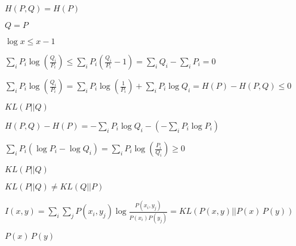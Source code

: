 \documentclass{article}
\def\lthtmlcheckvsize{\ifdim\ht\sizebox<\vsize 
  \ifdim\wd\sizebox<\hsize\expandafter\hfill\fi \expandafter\vfill
  \else\expandafter\vss\fi}%
\begin{document}
{\newpage\clearpage
{}%
$ H(P,Q)=H(P)$%
\lthtmlindisplaymathZ
\lthtmlcheckvsize\clearpage}

{\newpage\clearpage
{}%
$ Q=P$%
\lthtmlindisplaymathZ
\lthtmlcheckvsize\clearpage}

{\newpage\clearpage
{}%
$ \log x\le x-1$%
\lthtmlindisplaymathZ
\lthtmlcheckvsize\clearpage}

{\newpage\clearpage
{}%
$\displaystyle \sum_i P_i\log \left(\frac{Q_i}{P_i}\right) \le
\sum_i P_i \left( \frac{Q_i}{P_i}-1\right)
=\sum_i Q_i -\sum_i P_i =0$%
\lthtmlindisplaymathZ
\lthtmlcheckvsize\clearpage}

{\newpage\clearpage
{}%
$\displaystyle \sum_i P_i\log \left(\frac{Q_i}{P_i}\right)
=\sum_i P_i \log \left(\frac{1}{P_i}\right) +\sum_i P_i \log Q_i
=H(P)-H(P,Q)\le 0$%
\lthtmlindisplaymathZ
\lthtmlcheckvsize\clearpage}

{\newpage\clearpage
{}%
$\displaystyle KL(P||Q)$%
\lthtmlindisplaymathZ
\lthtmlcheckvsize\clearpage}

{\newpage\clearpage
{}%
$\displaystyle H(P,Q)-H(P)
=-\sum_i P_i \log Q_i-(-\sum_i P_i \log P_i)$%
\lthtmlindisplaymathZ
\lthtmlcheckvsize\clearpage}

{\newpage\clearpage
{}%
$\displaystyle \sum_i P_i (\log P_i-\log Q_i)=\sum_i P_i \log \left(\frac{P_i}{Q_i}\right)
\ge 0$%
\lthtmlindisplaymathZ
\lthtmlcheckvsize\clearpage}

{\newpage\clearpage
{}%
$ KL(P||Q)$%
\lthtmlindisplaymathZ
\lthtmlcheckvsize\clearpage}

{\newpage\clearpage
{}%
$ KL(P\vert\vert Q) \ne KL(Q\vert\vert P)$%
\lthtmlindisplaymathZ
\lthtmlcheckvsize\clearpage}

{\newpage\clearpage
{}%
$\displaystyle I(x,y)=\sum_i\sum_j P(x_i,y_j)\log\frac{P(x_i,y_j)}{P(x_i)P(y_j)}
=KL(P(x,y)||P(x)\,P(y))$%
\lthtmlindisplaymathZ
\lthtmlcheckvsize\clearpage}

{\newpage\clearpage
{}%
$ P(x)\,P(y)$%
\lthtmlindisplaymathZ
\lthtmlcheckvsize\clearpage}
\end{document}
